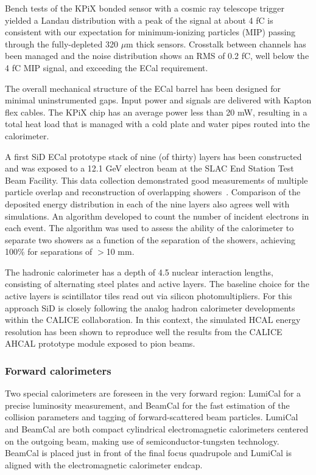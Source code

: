 Bench tests of the KPiX bonded sensor  with a cosmic ray telescope trigger yielded 
a Landau distribution with a peak of the signal at about 4 fC is consistent with our expectation for minimum-ionizing particles (MIP) passing through the fully-depleted 320 $\mu$m thick sensors. Crosstalk between channels has been managed and the 
 noise distribution shows an RMS of 0.2 fC, well below the 4 fC MIP signal, and exceeding the ECal requirement.

The overall mechanical structure of the ECal barrel has been designed for minimal uninstrumented gaps. Input power and signals are delivered with Kapton flex cables.
The KPiX chip has an average power less than 20 mW, resulting in a
total heat load  that is managed with a cold plate and water pipes routed 
into the calorimeter.

A first SiD ECal prototype stack of nine (of thirty) layers has been constructed and was exposed to a 12.1 GeV electron beam at the SLAC End Station Test Beam Facility. 
This data collection demonstrated good measurements of multiple particle overlap and reconstruction of overlapping showers~\cite{Steinhebel:2017qze}.  Comparison of the deposited energy distribution in each of the nine layers also agrees well with simulations.
An algorithm developed to count the number of incident electrons in each event. The algorithm was used to assess the ability of the calorimeter to separate two showers as a function of the separation of the showers, achieving 100\% for separations of $>$10 mm.



The hadronic
calorimeter has a depth of 4.5 nuclear interaction lengths, consisting of
alternating steel plates and active layers. The baseline choice for the active
layers is scintillator tiles read out via silicon photomultipliers. For this approach SiD is closely following the analog hadron calorimeter developments within the CALICE collaboration. In this context, the simulated HCAL energy resolution has been shown to reproduce well the results from the CALICE AHCAL prototype module exposed to pion beams.

\subsubsection{Forward calorimeters}
\label{susub:det:forward}
Two special calorimeters are foreseen in the very forward region: LumiCal for a precise luminosity measurement, and BeamCal for the fast estimation of the collision parameters and tagging of forward-scattered beam particles. LumiCal and BeamCal are both compact cylindrical electromagnetic calorimeters centered on the outgoing beam, making use of semiconductor-tungsten technology. BeamCal is placed just in front of the final focus quadrupole and LumiCal is aligned with the electromagnetic calorimeter endcap. 

